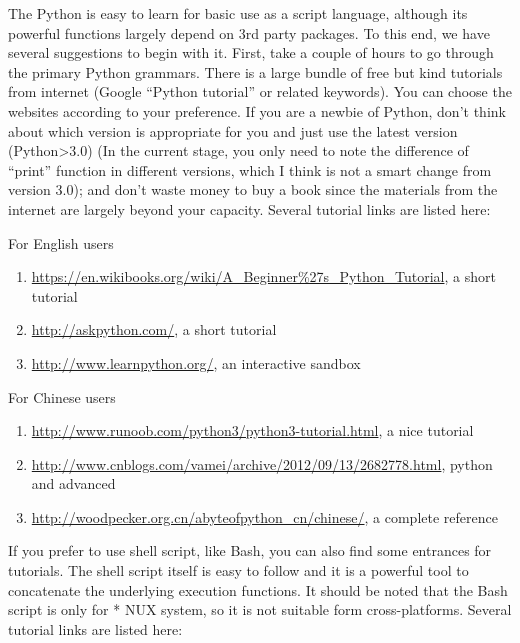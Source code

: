 \documentclass[letterpaper,10pt,english]{sphinxmanual}
\begin{document}
The Python is easy to learn for basic use as a script language, although its powerful functions largely depend on 3rd party packages. To this end, we have several suggestions to begin with it. First, take a couple of hours to go through the primary Python grammars. There is a large bundle of free but kind tutorials from internet (Google “Python tutorial” or related keywords). You can choose the websites according to your preference. If you are a newbie of Python, don’t think about which version is appropriate for you and just use the latest version (Python\textgreater{}3.0) (In the current stage, you only need to note the difference of “print” function in different versions, which I think is not a smart change from version 3.0); and don’t waste money to buy a book since the materials from the internet are largely beyond your capacity. Several tutorial links are listed here:

For English users
\begin{enumerate}
\item {} 
\href{https://en.wikibooks.org/wiki/A\_Beginner\%27s\_Python\_Tutorial}{https://en.wikibooks.org/wiki/A\_Beginner\%27s\_Python\_Tutorial}, a short tutorial

\item {} 
\href{http://askpython.com/}{http://askpython.com/}, a short tutorial

\item {} 
\href{http://www.learnpython.org/}{http://www.learnpython.org/}, an interactive sandbox

\end{enumerate}

For Chinese users
\begin{enumerate}
\item {} 
\href{http://www.runoob.com/python3/python3-tutorial.html}{http://www.runoob.com/python3/python3-tutorial.html}, a nice tutorial

\item {} 
\href{http://www.cnblogs.com/vamei/archive/2012/09/13/2682778.html}{http://www.cnblogs.com/vamei/archive/2012/09/13/2682778.html}, python and advanced

\item {} 
\href{http://woodpecker.org.cn/abyteofpython\_cn/chinese/}{http://woodpecker.org.cn/abyteofpython\_cn/chinese/}, a complete reference

\end{enumerate}

If you prefer to use shell script, like Bash, you can also find some entrances for tutorials. The shell script itself is easy to follow and it is a powerful tool to concatenate the underlying execution functions. It should be noted that the Bash script is only for * NUX system, so it is not suitable form cross-platforms. Several tutorial links are listed here:
\end{document}
